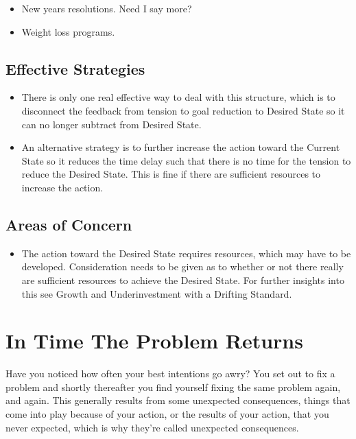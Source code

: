 \documentclass[]{memoir}
\begin{document}
\begin{itemize}
\itemsep1pt\parskip0pt
\item
  New years resolutions. Need I say more?
\item
  Weight loss programs.
\end{itemize}

\subsection{Effective Strategies}

\begin{itemize}
\itemsep1pt\parskip0pt
\item
  There is only one real effective way to deal with this structure,
  which is to disconnect the feedback from tension to goal reduction to
  Desired State so it can no longer subtract from Desired State.
\item
  An alternative strategy is to further increase the action toward the
  Current State so it reduces the time delay such that there is no time
  for the tension to reduce the Desired State. This is fine if there are
  sufficient resources to increase the action.
\end{itemize}

\subsection{Areas of Concern}

\begin{itemize}
\itemsep1pt\parskip0pt
\item
  The action toward the Desired State requires resources, which may have
  to be developed. Consideration needs to be given as to whether or not
  there really are sufficient resources to achieve the Desired State.
  For further insights into this see Growth and Underinvestment with a
  Drifting Standard.
\end{itemize}

\section{In Time The Problem Returns}

Have you noticed how often your best intentions go awry? You set out to
fix a problem and shortly thereafter you find yourself fixing the same
problem again, and again. This generally results from some unexpected
consequences, things that come into play because of your action, or the
results of your action, that you never expected, which is why they're
called unexpected consequences.
\end{document}

